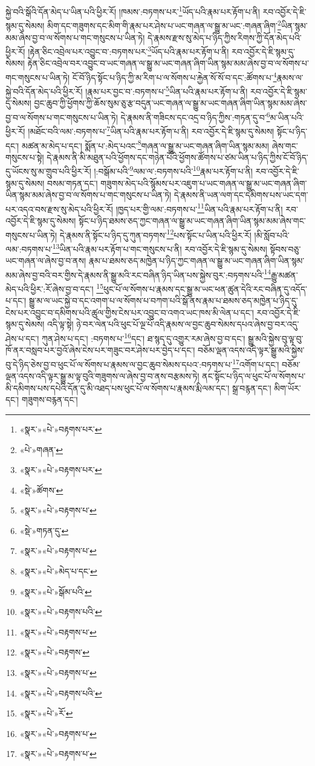 སྐྱེ་བའི་སྒོའི་དོན་མེད་པ་ཡིན་པའི་ཕྱིར་རོ། །ཁམས་:བཏགས་པར་\footnote{«སྣར་»«པེ་»བརྟགས་པར་}ཡོད་པའི་རྣམ་པར་རྟོག་པ་ནི། རབ་འབྱོར་དེ་ཇི་སྙམ་དུ་སེམས། མིག་དང་གཟུགས་དང་མིག་གི་རྣམ་པར་ཤེས་པ་ཡང་གཞན་ལ་སྒྱུ་མ་ཡང་:གཞན་ཞིག་\footnote{«པེ་»གཞན་}ཡིན་སྙམ་མམ་ཞེས་བྱ་བ་ལ་སོགས་པ་གང་གསུངས་པ་ཡིན་ཏེ། དེ་རྣམས་རྫས་སུ་མེད་པ་ཉིད་ཀྱིས་རིགས་ཀྱི་དོན་མེད་པའི་ཕྱིར་རོ། །རྟེན་ཅིང་འབྲེལ་པར་འབྱུང་བ་:བཏགས་པར་\footnote{«སྣར་»«པེ་»བརྟགས་པར་}ཡོད་པའི་རྣམ་པར་རྟོག་པ་ནི། རབ་འབྱོར་དེ་ཇི་སྙམ་དུ་སེམས། རྟེན་ཅིང་འབྲེལ་བར་འབྱུང་བ་ཡང་གཞན་ལ་སྒྱུ་མ་ཡང་གཞན་ཞིག་ཡིན་སྙམ་མམ་ཞེས་བྱ་བ་ལ་སོགས་པ་གང་གསུངས་པ་ཡིན་ཏེ། ངོ་བོ་ཉིད་སྟོང་པ་ཉིད་ཀྱི་མ་རིག་པ་ལ་སོགས་པ་རྐྱེན་སོ་སོ་བ་དང་:ཚོགས་པ་\footnote{«སྡེ་»ཚོགས་}རྣམས་ལ་སྐྱེ་བའི་དོན་མེད་པའི་ཕྱིར་རོ། །རྣམ་པར་བྱང་བ་:བཏགས་པ་\footnote{«སྣར་»«པེ་»བརྟགས་པ་}ཡིན་པའི་རྣམ་པར་རྟོག་པ་ནི། རབ་འབྱོར་དེ་ཇི་སྙམ་དུ་སེམས། བྱང་ཆུབ་ཀྱི་ཕྱོགས་ཀྱི་ཆོས་སུམ་ཅུ་རྩ་བདུན་ཡང་གཞན་ལ་སྒྱུ་མ་ཡང་གཞན་ཞིག་ཡིན་སྙམ་མམ་ཞེས་བྱ་བ་ལ་སོགས་པ་གང་གསུངས་པ་ཡིན་ཏེ། དེ་རྣམས་ནི་གཟིངས་དང་འདྲ་བ་ཉིད་ཀྱིས་:གཏན་དུ་བ་\footnote{«སྡེ་»གཏན་དུ་}མ་ཡིན་པའི་ཕྱིར་རོ། །མཐོང་བའི་ལམ་:བཏགས་པ་\footnote{«སྣར་»«པེ་»བརྟགས་པ་}ཡིན་པའི་རྣམ་པར་རྟོག་པ་ནི། རབ་འབྱོར་དེ་ཇི་སྙམ་དུ་སེམས། སྟོང་པ་ཉིད་དང་། མཚན་མ་མེད་པ་དང་། སྨོན་པ་:མེད་པའང་\footnote{«སྣར་»«པེ་»མེད་པ་དང་}གཞན་ལ་སྒྱུ་མ་ཡང་གཞན་ཞིག་ཡིན་སྙམ་མམ། ཞེས་གང་གསུངས་པ་སྟེ། དེ་རྣམས་ནི་མི་མཐུན་པའི་ཕྱོགས་དང་གཉེན་པོའི་ཕྱོགས་ཚོགས་པ་ཙམ་ཡིན་པ་ཉིད་ཀྱིས་ངོ་བོ་ཉིད་དུ་ཡོངས་སུ་མ་གྲུབ་པའི་ཕྱིར་རོ། །:བསྒོམ་པའི་\footnote{«སྣར་»«པེ་»སྒོམ་པའི་}ལམ་ལ་:བཏགས་པའི་\footnote{«སྣར་»«པེ་»བརྟགས་པའི་}རྣམ་པར་རྟོག་པ་ནི། རབ་འབྱོར་དེ་ཇི་སྙམ་དུ་སེམས། བསམ་གཏན་དང་། གཟུགས་མེད་པའི་སྙོམས་པར་འཇུག་པ་ཡང་གཞན་ལ་སྒྱུ་མ་ཡང་གཞན་ཞིག་ཡིན་སྙམ་མམ་ཞེས་བྱ་བ་ལ་སོགས་པ་གང་གསུངས་པ་ཡིན་ཏེ། དེ་རྣམས་ནི་ཡན་ལག་དང་དམིགས་པས་ཡང་དག་པར་འདའ་བས་རྫས་སུ་མེད་པའི་ཕྱིར་རོ། །ཁྱད་པར་གྱི་ལམ་:བཏགས་པ་\footnote{«སྣར་»«པེ་»བརྟགས་པ་}ཡིན་པའི་རྣམ་པར་རྟོག་པ་ནི། རབ་འབྱོར་དེ་ཇི་སྙམ་དུ་སེམས། སྟོང་པ་ཉིད་ཐམས་ཅད་ཀྱང་གཞན་ལ་སྒྱུ་མ་ཡང་གཞན་ཞིག་ཡིན་སྙམ་མམ་ཞེས་གང་གསུངས་པ་ཡིན་ཏེ། དེ་རྣམས་ནི་སྟོང་པ་ཉིད་དུ་ཀུན་བཏགས་\footnote{«སྣར་»«པེ་»བརྟགས་}པས་སྟོང་པ་ཡིན་པའི་ཕྱིར་རོ། །མི་སློབ་པའི་ལམ་:བཏགས་པ་\footnote{«སྣར་»«པེ་»བརྟགས་པ་}ཡིན་པའི་རྣམ་པར་རྟོག་པ་གང་གསུངས་པ་ནི། རབ་འབྱོར་དེ་ཇི་སྙམ་དུ་སེམས། སྟོབས་བཅུ་ཡང་གཞན་ལ་ཞེས་བྱ་བ་ནས། རྣམ་པ་ཐམས་ཅད་མཁྱེན་པ་ཉིད་ཀྱང་གཞན་ལ་སྒྱུ་མ་ཡང་གཞན་ཞིག་ཡིན་སྙམ་མམ་ཞེས་བྱ་བའི་བར་གྱིས་དེ་རྣམས་ནི་སྒྱུ་མའི་རང་བཞིན་ཉིད་ཡིན་པས་སྐྱེས་བུར་:བཏགས་པའི་\footnote{«སྣར་»«པེ་»བརྟགས་པའི་}རྒྱུ་མཚན་མེད་པའི་ཕྱིར་:རོ་ཞེས་བྱ་བ་དང་། \footnote{«སྣར་»«པེ་»རོ་}ཕུང་པོ་ལ་སོགས་པ་རྣམས་དང་སྒྱུ་མ་ཡང་ཕན་ཚུན་དེའི་རང་བཞིན་དུ་འདོད་པ་དང་། སྒྱུ་མ་ལ་ཡང་སྐྱེ་བ་དང་འགག་པ་ལ་སོགས་པ་བཀག་པའི་སྒོ་ནས་རྣམ་པ་ཐམས་ཅད་མཁྱེན་པ་ཉིད་དུ་ངེས་པར་འབྱུང་བ་དམིགས་པའི་ཚུལ་གྱིས་ངེས་པར་འབྱུང་བ་འགའ་ཡང་ཁས་མི་ལེན་པ་དང་། རབ་འབྱོར་དེ་ཇི་སྙམ་དུ་སེམས། འདི་ལྟ་སྟེ། ཉེ་བར་ལེན་པའི་ཕུང་པོ་ལྔ་པོ་འདི་རྣམས་ལ་བྱང་ཆུབ་སེམས་དཔའ་ཞེས་བྱ་བར་འདུ་ཤེས་པ་དང་། ཀུན་ཤེས་པ་དང་། :བཏགས་པ་\footnote{«སྣར་»«པེ་»བརྟགས་པ་}དང་། ཐ་སྙད་དུ་འགྱུར་རམ་ཞེས་བྱ་བ་དང་། སྒྱུ་མའི་སྐྱེས་བུ་ལྟ་བུ་ཁོ་ནར་བསླབ་པར་བྱའོ་ཞེས་ངེས་པར་གཟུང་བར་ཤེས་པར་བྱེད་པ་དང་། བཅོམ་ལྡན་འདས་འདི་ལྟར་སྒྱུ་མའི་སྐྱེས་བུ་དེ་ཉིད་ཅེས་བྱ་བ་ཕུང་པོ་ལ་སོགས་པ་རྣམས་ལ་བྱང་ཆུབ་སེམས་དཔའ་:བཏགས་པ་\footnote{«སྣར་»«པེ་»བརྟགས་པ་}འགོག་པ་དང་། བཅོམ་ལྡན་འདས་འདི་ལྟར་སྒྱུ་མ་ལྟ་བུའི་གཟུགས་ལ་ཞེས་བྱ་བ་ནས་བརྩམས་ཏེ། ནང་སྟོང་པ་ཉིད་ལ་ཕུང་པོ་ལ་སོགས་པ་མི་དམིགས་པས་དཔེའི་དོན་དུ་མི་འཐད་པས་ཕུང་པོ་ལ་སོགས་པ་རྣམས་རྨི་ལམ་དང་། སྒྲ་བརྙན་དང་། མིག་ཡོར་དང་། གཟུགས་བརྙན་དང་། 